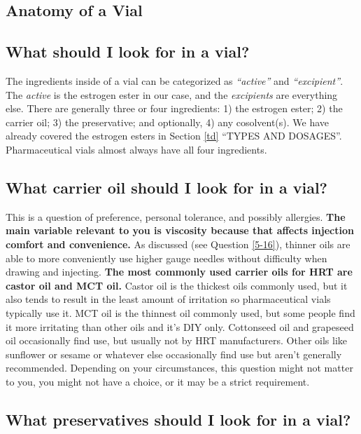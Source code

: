 \documentclass{article}
\begin{document}
\subsection*{Anatomy of a Vial}

\subsection{What should I look for in a vial?}

The ingredients inside of a vial can be categorized as \textit{“active”} and \textit{“excipient”}. The \textit{active} is the estrogen ester in our case, and the \textit{excipients} are everything else. There are generally three or four ingredients: 1) the estrogen ester; 2) the carrier oil; 3) the preservative; and optionally, 4) any cosolvent(s). We have already covered the estrogen esters in Section \ref{td} “TYPES AND DOSAGES”. Pharmaceutical vials almost always have all four ingredients.

\subsection{What carrier oil should I look for in a vial?}\label{6-16}

This is a question of preference, personal tolerance, and possibly allergies. \textbf{The main variable relevant to you is viscosity because that affects injection comfort and convenience.} As discussed (see Question \ref{5-16}), thinner oils are able to more conveniently use higher gauge needles without difficulty when drawing and injecting. \textbf{The most commonly used carrier oils for HRT are castor oil and MCT oil.} Castor oil is the thickest oils commonly used, but it also tends to result in the least amount of irritation so pharmaceutical vials typically use it. MCT oil is the thinnest oil commonly used, but some people find it more irritating than other oils and it’s DIY only. Cottonseed oil and grapeseed oil occasionally find use, but usually not by HRT manufacturers. Other oils like sunflower or sesame or whatever else occasionally find use but aren’t generally recommended. Depending on your circumstances, this question might not matter to you, you might not have a choice, or it may be a strict requirement.

\subsection{What preservatives should I look for in a vial?}\label{6-17}
\end{document}
